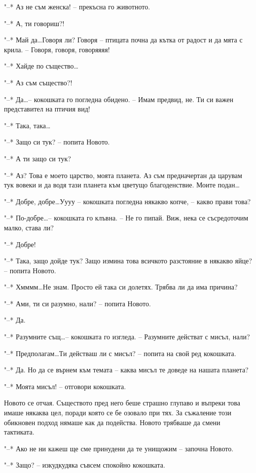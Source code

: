 \documentclass[ebook,openany,12pt]{memoir}
\begin{document}
"--* Аз не съм женска! – прекъсна го животното.

"--* А, ти говориш?!

"--* Май да\ldots Говоря ли? Говоря – птицата почна да кътка от радост и да мята с крила. – Говоря, говоря, говоряяяя!

"--* Хайде по същество\ldots

"--* Аз съм същество?!

"--* Да\ldots – кокошката го погледна обидено. – Имам предвид, не. Ти си важен представител на птичия вид!

"--* Така, така\ldots

"--* Защо си тук? – попита Новото.

"--* А ти защо си тук?

"--* Аз? Това е моето царство, моята планета. Аз съм предначертан да царувам тук вовеки и да водя тази планета към цветущо благоденствие. Моите подан\ldots

"--* Добре, добре\ldots Уууу – кокошката погледна някакво копче, – какво прави това?

"--* По-добре\ldots – кокошката го клъвна. – Не го пипай. Виж, нека се съсредоточим малко, става ли?

"--* Добре!

"--* Така, защо дойде тук? Защо измина това всичкото разстояние в някакво яйце? – попита Новото.

"--* Хмммм\ldots Не знам. Просто ей така си долетях. Трябва ли да има причина?

"--* Ами, ти си разумно, нали? – попита Новото.

"--* Да.

"--* Разумните същ\ldots – кокошката го изгледа. – Разумните действат с мисъл, нали?

"--* Предполагам\ldots Ти действаш ли с мисъл? – попита на свой ред кокошката.

"--* Да. Но да се върнем към темата – каква мисъл те доведе на нашата планета?

"--* Моята мисъл! – отговори кокошката.

Новото се отчая. Съществото пред него беше страшно глупаво и въпреки това имаше някаква цел, поради която се бе озовало при тях. За съжаление този обикновен подход нямаше как да подейства. Новото трябваше да смени тактиката.

"--* Ако не ни кажеш ще сме принудени да те унищожим – започна Новото.

"--* Защо? – изкудкудяка съвсем спокойно кокошката.
\end{document}
